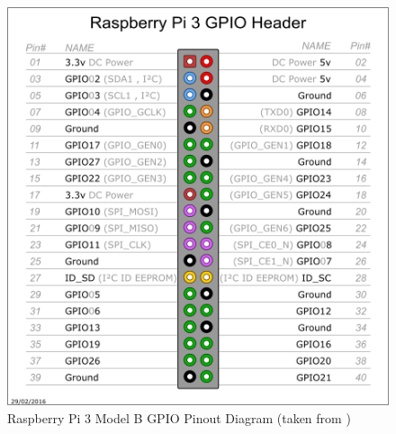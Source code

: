 \documentclass[twoside,a4]{report}
\begin{document}
	\begin{figure}[!htb]
		\centering
		\includegraphics[scale=0.2]{images/gpiopinout.png}
		\caption{Raspberry Pi 3 Model B GPIO Pinout Diagram (taken from  \cite{pigpiopinout})}
		\label{gpiopinout}
	\end{figure}
	
\end{document}
